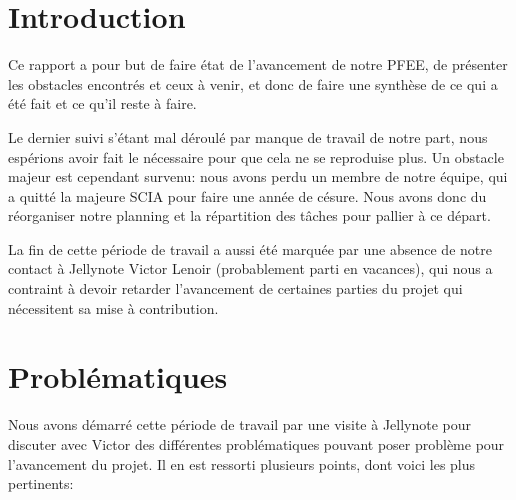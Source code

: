 \documentclass[12pt]{article}
\begin{document}



\newpage
\tableofcontents

\newpage
\clearpage

\section{Introduction}

\par Ce rapport a pour but de faire état de l'avancement de notre PFEE, de présenter les obstacles encontrés et ceux à venir, et donc de faire une synthèse de ce qui a été fait et ce qu'il reste à faire.

\par Le dernier suivi s'étant mal déroulé par manque de travail de notre part, nous espérions avoir fait le nécessaire pour que cela ne se reproduise plus. Un obstacle majeur est cependant survenu: nous avons perdu un membre de notre équipe, qui a quitté la majeure SCIA pour faire une année de césure. Nous avons donc du réorganiser notre planning et la répartition des tâches pour pallier à ce départ.

\par La fin de cette période de travail a aussi été marquée par une absence de notre contact à Jellynote Victor Lenoir (probablement parti en vacances), qui nous a contraint à devoir retarder l'avancement de certaines parties du projet qui nécessitent sa mise à contribution.

\section{Problématiques}
\label{sec:prob}

\par Nous avons démarré cette période de travail par une visite à Jellynote pour discuter avec Victor des différentes problématiques pouvant poser problème pour l'avancement du projet. Il en est ressorti plusieurs points, dont voici les plus pertinents:\\
\end{document}
